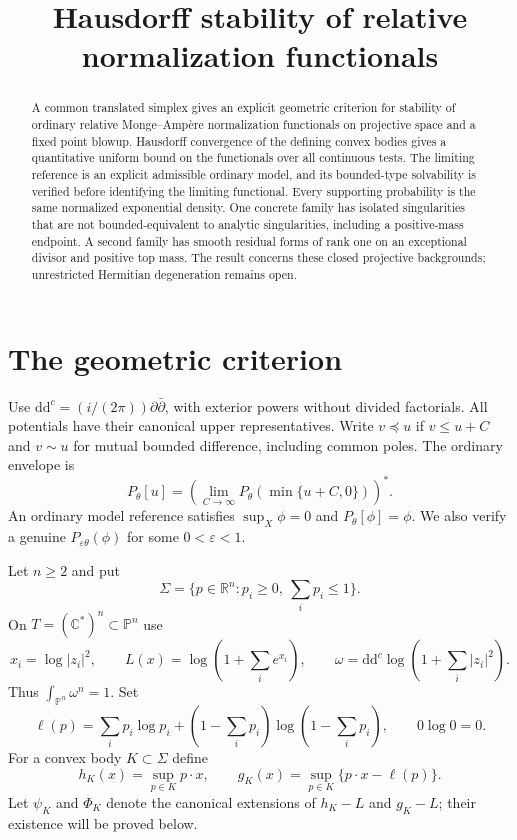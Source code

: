 \documentclass[11pt]{article}
\title{Hausdorff stability of relative normalization functionals}
\author{}
\date{}
\newcommand{\ddc}{\mathrm d\mathrm d^c}
\newcommand{\CP}{\mathbb P}
\begin{document}
\maketitle
\begin{abstract}
A common translated simplex gives an explicit geometric criterion for
stability of ordinary relative Monge--Amp\`ere normalization functionals
on projective space and a fixed point blowup. Hausdorff convergence of
the defining convex bodies gives a quantitative uniform bound on the
functionals over all continuous tests. The limiting reference is an
explicit admissible ordinary model, and its bounded-type solvability is
verified before identifying the limiting functional. Every supporting
probability is the same normalized exponential density. One concrete
family has isolated singularities that are not bounded-equivalent to
analytic singularities, including a positive-mass endpoint. A second
family has smooth residual forms of rank one on an exceptional divisor
and positive top mass. The result concerns these closed projective
backgrounds; unrestricted Hermitian degeneration remains open.
\end{abstract}

\section{The geometric criterion}

Use $\ddc=(i/(2\pi))\partial\bar\partial$, with exterior powers without
divided factorials. All potentials have their canonical upper
representatives. Write $v\preceq u$ if $v\le u+C$ and $v\sim u$ for
mutual bounded difference, including common poles. The ordinary envelope is
\[
 P_\theta[u]=\left(\lim_{C\to\infty}
 P_\theta(\min\{u+C,0\})\right)^*.
\]
An ordinary model reference satisfies $\sup_X\phi=0$ and
$P_\theta[\phi]=\phi$. We also verify a genuine
$P_{\varepsilon\theta}(\phi)$ for some $0<\varepsilon<1$.

Let $n\ge2$ and put
\[
 \Sigma=\{p\in\mathbb R^n:p_i\ge0,\ \textstyle\sum_i p_i\le1\}.
\]
On $T=(\mathbb C^*)^n\subset\CP^n$ use
\[
 x_i=\log|z_i|^2,\qquad L(x)=\log(1+\textstyle\sum_i e^{x_i}),
 \qquad\omega=\ddc\log(1+\textstyle\sum_i|z_i|^2).
\]
Thus $\int_{\CP^n}\omega^n=1$. Set
\[
 \ell(p)=\sum_i p_i\log p_i+
       (1-\textstyle\sum_i p_i)\log(1-\textstyle\sum_i p_i),
 \qquad 0\log0=0.
\]
For a convex body $K\subset\Sigma$ define
\[
 h_K(x)=\sup_{p\in K}p\cdot x,\qquad
 g_K(x)=\sup_{p\in K}\{p\cdot x-\ell(p)\}.
\]
Let $\psi_K$ and $\Phi_K$ denote the canonical extensions of
$h_K-L$ and $g_K-L$; their existence will be proved below.
\end{document}
